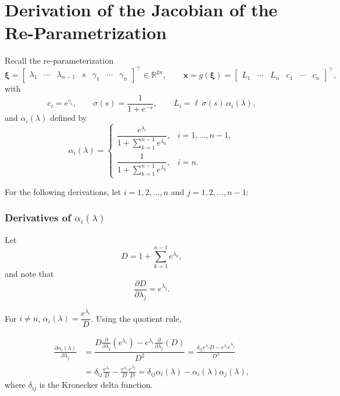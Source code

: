 \chapter{Derivation of the Jacobian of the Re-Parametrization}
\label{app:calc_dydx}

Recall the re-parameterization
\begin{equation*}
\bm{\xi} = \begin{bmatrix}
\lambda_1 & \cdots & \lambda_{n-1} & s & \gamma_1 & \cdots & \gamma_n
\end{bmatrix}^\top
\in \mathbb{R}^{2n},
\qquad
\mathbf{x} = g(\bm{\xi}) = \begin{bmatrix}
L_1 & \cdots & L_n & c_1 & \cdots & c_n
\end{bmatrix}^\top,
\end{equation*}
with
\begin{equation*}
c_i = e^{\gamma_i},
\qquad
\sigma(s) = \frac{1}{1+e^{-s}},
\qquad
L_i = \ell\,\sigma(s)\,\alpha_i(\lambda),
\end{equation*}
and $\alpha_i(\lambda)$ defined by
\begin{equation*}
\alpha_i(\lambda)
=\begin{cases}
\dfrac{e^{\lambda_i}}{1+\sum_{k=1}^{n-1} e^{\lambda_k}}, & i = 1,\dots,n-1,\\[16pt]
\dfrac{1}{1+\sum_{k=1}^{n-1} e^{\lambda_k}}, & i=n.
\end{cases}
\end{equation*}

For the following derivations, let $i = 1,2,\dots,n$ and $j = 1,2,\dots,n-1$:

\subsection*{Derivatives of $\alpha_i(\lambda)$}
Let
\begin{equation*}
D = 1 + \sum_{k=1}^{n-1} e^{\lambda_k},
\end{equation*}
and note that
\begin{equation*}
\frac{\partial D}{\partial \lambda_j} = e^{\lambda_j}.
\end{equation*}

For $i\neq n$, $\alpha_i(\lambda) = \dfrac{e^{\lambda_i}}{D}$. Using the quotient rule,

\begin{align*}
\frac{\partial \alpha_i(\lambda)}{\partial \lambda_j}
&=
\dfrac{D \frac{\partial}{\partial \lambda_j}(e^{\lambda_i}) - e^{\lambda_i} \frac{\partial}{\partial \lambda_j}(D)}{D^2}
=
\frac{
\delta_{ij} e^{\lambda_i} D -
e^{\lambda_i} e^{\lambda_j}
}{
D^2
}\\
&= \delta_{ij} \frac{ e^{\lambda_i}}{D} - \frac{ e^{\lambda_i}}{D} \frac{ e^{\lambda_j}}{D} = \delta_{ij} \alpha_i(\lambda) - \alpha_i(\lambda) \alpha_j(\lambda),
\end{align*}
where $\delta_{ij}$ is the Kronecker delta function.

